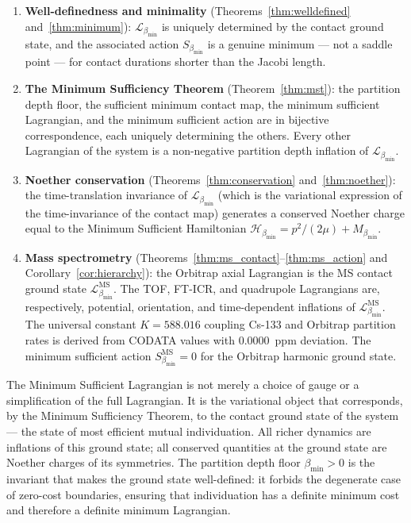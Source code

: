\documentclass[12pt, a4paper]{article}
\theoremstyle{plain}
\theoremstyle{definition}
\theoremstyle{remark}
\newcommand{\bmin}{\beta_{\min}}
\newcommand{\Lmin}{\mathcal{L}_{\bmin}}
\newcommand{\Smin}{S_{\bmin}}
\newcommand{\Hmin}{\mathcal{H}_{\bmin}}
\begin{document}
\begin{enumerate}
\item \textbf{Well-definedness and minimality} (Theorems~\ref{thm:welldefined}
  and~\ref{thm:minimum}): $\Lmin$ is uniquely determined by the contact ground
  state, and the associated action $\Smin$ is a genuine minimum --- not a
  saddle point --- for contact durations shorter than the Jacobi length.

\item \textbf{The Minimum Sufficiency Theorem} (Theorem~\ref{thm:mst}): the
  partition depth floor, the sufficient minimum contact map, the minimum
  sufficient Lagrangian, and the minimum sufficient action are in bijective
  correspondence, each uniquely determining the others. Every other Lagrangian
  of the system is a non-negative partition depth inflation of $\Lmin$.

\item \textbf{Noether conservation} (Theorems~\ref{thm:conservation}
  and~\ref{thm:noether}): the time-translation invariance of $\Lmin$ (which
  is the variational expression of the time-invariance of the contact map)
  generates a conserved Noether charge equal to the Minimum Sufficient
  Hamiltonian $\Hmin = p^2/(2\mu) + M_{\bmin}$.

\item \textbf{Mass spectrometry} (Theorems~\ref{thm:ms_contact}--\ref{thm:ms_action}
  and Corollary~\ref{cor:hierarchy}): the Orbitrap axial Lagrangian is the
  MS contact ground state $\Lmin^{\mathrm{MS}}$. The TOF, FT-ICR, and
  quadrupole Lagrangians are, respectively, potential, orientation, and
  time-dependent inflations of $\Lmin^{\mathrm{MS}}$. The universal constant
  $K = 588.016$ coupling Cs-133 and Orbitrap partition rates is derived from
  CODATA values with $0.0000$~ppm deviation. The minimum sufficient action
  $\Smin^{\mathrm{MS}} = 0$ for the Orbitrap harmonic ground state.
\end{enumerate}

The Minimum Sufficient Lagrangian is not merely a choice of gauge or a
simplification of the full Lagrangian. It is the variational object that
corresponds, by the Minimum Sufficiency Theorem, to the contact ground state
of the system --- the state of most efficient mutual individuation. All richer
dynamics are inflations of this ground state; all conserved quantities at the
ground state are Noether charges of its symmetries. The partition depth floor
$\bmin > 0$ is the invariant that makes the ground state well-defined: it
forbids the degenerate case of zero-cost boundaries, ensuring that individuation
has a definite minimum cost and therefore a definite minimum Lagrangian.



\end{document}
